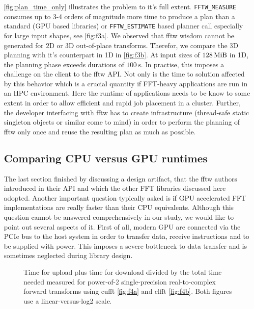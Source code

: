 \cref{fig:plan_time_only} illustrates the problem to it's full extent. \texttt{FFTW\_MEASURE} consumes up to 3-4 orders of magnitude more time to produce a plan than a standard (GPU based libraries) or \texttt{FFTW\_ESTIMATE} based planner call especially for large input shapes, see \cref{fig:f3a}. We observed that fftw wisdom cannot be generated for 2D or 3D out-of-place transforms. Therefor, we compare the 3D planning with it's counterpart in 1D in \cref{fig:f3b}. At input sizes of $\SI{128}{\mebi\byte}$ in 1D, the planning phase exceeds durations of $\SI{100}{\s}$. In practise, this imposes a challenge on the client to the fftw API. Not only is the time to solution affected by this behavior which is a crucial quantity if FFT-heavy applications are run in an HPC environment. Here the runtime of applications needs to be know to some extent in order to allow efficient and rapid job placement in a cluster. Further, the developer interfacing with fftw has to create infrastructure (thread-safe static singleton objects or similar come to mind) in order to perform the planning of fftw only once and reuse the resulting plan as much as possible.

\subsection{Comparing CPU versus GPU runtimes}
\label{ssec:cpu_vs_gpu}

The last section finished by discussing a design artifact, that the fftw authors introduced in their API and which the other FFT libraries discussed here adopted. Another important question typically asked is if GPU accelerated FFT implementations are really faster than their CPU equivalents. Although this question cannot be answered comprehensively in our study, we would like to point out several aspects of it. First of all, modern GPU are connected via the PCIe bus to the host system in order to transfer data, receive instructions and to be supplied with power. This imposes a severe bottleneck to data transfer and is sometimes neglected during library design. 

\begin{figure}[!tbp]
  \centering
  \def\svgwidth{0.95\columnwidth}
  
  \def\svgwidth{0.45\columnwidth}
  \subfloat[cufft 8.0.44]{\label{fig:f4a}}
  \hfill
  \def\svgwidth{0.45\columnwidth}
  \subfloat[clfft 2.12.2]{\label{fig:f4b}}
  \caption{Time for upload plus time for download divided by the total time needed measured for power-of-2 single-precision real-to-complex forward transforms using cufft \cref{fig:f4a} and clfft \cref{fig:f4b}. Both figures use a linear-versus-log2 scale.}
  \label{fig:device_transfer}
\end{figure}

